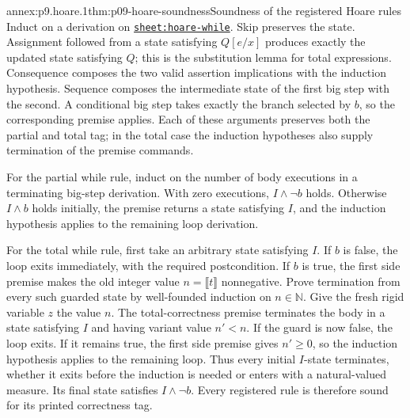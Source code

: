 \begin{annexitem}{annex:p9.hoare.1}{thm:p09-hoare-soundness}{Soundness of the registered Hoare rules}
Induct on a derivation on
\hyperref[sheet:hoare-while]{\texttt{sheet:hoare-while}}.  Skip preserves the
state.  Assignment followed from a state satisfying \(Q[e/x]\) produces
exactly the updated state satisfying \(Q\); this is the substitution lemma for
total expressions.  Consequence composes the two valid assertion implications
with the induction hypothesis.  Sequence composes the intermediate state of
the first big step with the second.  A conditional big step takes exactly the
branch selected by \(b\), so the corresponding premise applies.  Each of these
arguments preserves both the partial and total tag; in the total case the
induction hypotheses also supply termination of the premise commands.

For the partial while rule, induct on the number of body executions in a
terminating big-step derivation.  With zero executions, \(I\land\neg b\) holds.
Otherwise \(I\land b\) holds initially, the premise returns a state satisfying
\(I\), and the induction hypothesis applies to the remaining loop derivation.

For the total while rule, first take an arbitrary state satisfying \(I\).  If
\(b\) is false, the loop exits immediately, with the required postcondition.
If \(b\) is true, the first side premise makes the old integer value
\(n=\llbracket t\rrbracket\) nonnegative.  Prove termination from every such
guarded state by well-founded induction on \(n\in\mathbb N\).  Give the fresh
rigid variable \(z\) the value \(n\).  The total-correctness premise terminates
the body in a state satisfying \(I\) and having variant value \(n'<n\).  If
the guard is now false, the loop exits.  If it remains true, the first side
premise gives \(n'\geq0\), so the induction hypothesis applies to the
remaining loop.  Thus every initial \(I\)-state terminates, whether it exits
before the induction is needed or enters with a natural-valued measure.  Its
final state satisfies \(I\land\neg b\).  Every registered rule is therefore
sound for its printed correctness tag.
\end{annexitem}

